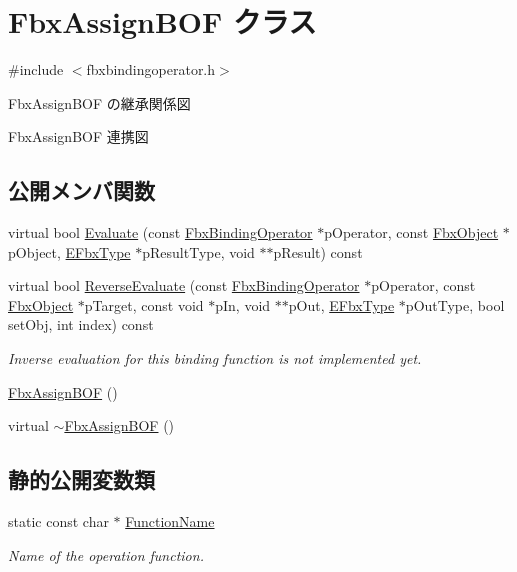 \hypertarget{class_fbx_assign_b_o_f}{}\section{Fbx\+Assign\+B\+OF クラス}
\label{class_fbx_assign_b_o_f}


{\ttfamily \#include $<$fbxbindingoperator.\+h$>$}



Fbx\+Assign\+B\+OF の継承関係図


Fbx\+Assign\+B\+OF 連携図
\subsection*{公開メンバ関数}
\begin{DoxyCompactItemize}
\item 
virtual bool \hyperlink{class_fbx_assign_b_o_f_a8d560108ab481a3087cc6a997284617c}{Evaluate} (const \hyperlink{class_fbx_binding_operator}{Fbx\+Binding\+Operator} $\ast$p\+Operator, const \hyperlink{class_fbx_object}{Fbx\+Object} $\ast$p\+Object, \hyperlink{fbxpropertytypes_8h_a73913a5ddfb20e57c6f25e9e6784bd92}{E\+Fbx\+Type} $\ast$p\+Result\+Type, void $\ast$$\ast$p\+Result) const
\item 
virtual bool \hyperlink{class_fbx_assign_b_o_f_ae2342d6ad5f7bc8182cc14c562290247}{Reverse\+Evaluate} (const \hyperlink{class_fbx_binding_operator}{Fbx\+Binding\+Operator} $\ast$p\+Operator, const \hyperlink{class_fbx_object}{Fbx\+Object} $\ast$p\+Target, const void $\ast$p\+In, void $\ast$$\ast$p\+Out, \hyperlink{fbxpropertytypes_8h_a73913a5ddfb20e57c6f25e9e6784bd92}{E\+Fbx\+Type} $\ast$p\+Out\+Type, bool set\+Obj, int index) const
\begin{DoxyCompactList}\small\item\em Inverse evaluation for this binding function is not implemented yet. \end{DoxyCompactList}\item 
\hyperlink{class_fbx_assign_b_o_f_a4bc01f55fb7c8103bd2170ca033ec77b}{Fbx\+Assign\+B\+OF} ()
\item 
virtual \hyperlink{class_fbx_assign_b_o_f_ae9e45cfddb130ed0b5758c50be05f11d}{$\sim$\+Fbx\+Assign\+B\+OF} ()
\end{DoxyCompactItemize}
\subsection*{静的公開変数類}
\begin{DoxyCompactItemize}
\item 
static const char $\ast$ \hyperlink{class_fbx_assign_b_o_f_a65ac910c4b20983717f7556ae8ee7a27}{Function\+Name}
\begin{DoxyCompactList}\small\item\em Name of the operation function. \end{DoxyCompactList}\end{DoxyCompactItemize}


